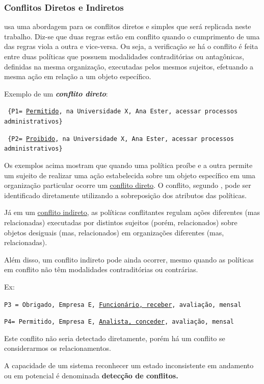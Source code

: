 \subsubsection{Conflitos Diretos e Indiretos}
 usa uma abordagem para os conflitos diretos e simples que será replicada neste trabalho. Diz-se que duas regras estão em conflito quando o cumprimento de uma das regras viola a outra e vice-versa. Ou seja, a verificação se há o conflito é feita entre duas políticas que possuem modalidades contraditórias ou antagônicas, definidas na mesma organização, executadas pelos mesmos sujeitos, efetuando a mesma ação em relação a um objeto específico.

Exemplo de um \textit{\textbf{conflito direto}}:

{\scriptsize \texttt{ \{P1= {\underline{Permitido}, na Universidade X, Ana Ester, acessar processos administrativos\} }}}

{\scriptsize \texttt{ \{P2= {\underline{Proibido}, na Universidade X, Ana Ester, acessar processos administrativos\} }}}

Os exemplos acima mostram que quando uma política proíbe e a outra permite um sujeito de realizar uma ação estabelecida sobre um objeto específico em uma organização particular ocorre um \underline{conflito direto}. O conflito, segundo , pode ser identificado diretamente utilizando a sobreposição dos atributos das políticas.

Já em um \underline{conflito indireto,} as políticas conflitantes regulam ações diferentes (mas relacionadas) executadas por distintos sujeitos (porém, relacionados) sobre objetos desiguais (mas, relacionados) em organizações diferentes (mas, relacionadas). \cite[p.24]{sarkis2017}

Além disso, um conflito indireto pode ainda ocorrer, mesmo quando as políticas em conflito não têm modalidades contraditórias ou contrárias.

Ex:

{\scriptsize \texttt{P3 = {Obrigado, Empresa E, \underline{Funcionário, receber}, avaliação, mensal}}}

{\scriptsize \texttt{P4= {Permitido, Empresa E, \underline{Analista, conceder}, avaliação, mensal}}}

Este conflito não seria detectado diretamente, porém há um conflito se considerarmos os relacionamentos.

A capacidade de um sistema reconhecer um estado inconsistente em andamento ou em potencial é denominada \textbf{detecção de conflitos.}

